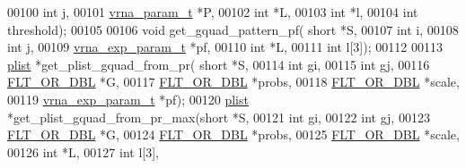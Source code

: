 \begin{DoxyCode}
00100                               \textcolor{keywordtype}{int} j,
00101                               \hyperlink{group__energy__parameters_structvrna__param__s}{vrna\_param\_t} *P,
00102                               \textcolor{keywordtype}{int} *L,
00103                               \textcolor{keywordtype}{int} *l,
00104                               \textcolor{keywordtype}{int} threshold);
00105 
00106 \textcolor{keywordtype}{void}        get\_gquad\_pattern\_pf( \textcolor{keywordtype}{short} *S,
00107                                   \textcolor{keywordtype}{int} i,
00108                                   \textcolor{keywordtype}{int} j,
00109                                   \hyperlink{group__energy__parameters_structvrna__exp__param__s}{vrna\_exp\_param\_t} *pf,
00110                                   \textcolor{keywordtype}{int} *L,
00111                                   \textcolor{keywordtype}{int} l[3]);
00112 
00113 \hyperlink{group__data__structures_structvrna__plist__s}{plist}       *get\_plist\_gquad\_from\_pr( \textcolor{keywordtype}{short} *S,
00114                                       \textcolor{keywordtype}{int} gi,
00115                                       \textcolor{keywordtype}{int} gj,
00116                                       \hyperlink{group__data__structures_ga31125aeace516926bf7f251f759b6126}{FLT\_OR\_DBL} *G,
00117                                       \hyperlink{group__data__structures_ga31125aeace516926bf7f251f759b6126}{FLT\_OR\_DBL} *probs,
00118                                       \hyperlink{group__data__structures_ga31125aeace516926bf7f251f759b6126}{FLT\_OR\_DBL} *scale,
00119                                       \hyperlink{group__energy__parameters_structvrna__exp__param__s}{vrna\_exp\_param\_t} *pf);
00120 \hyperlink{group__data__structures_structvrna__plist__s}{plist}       *get\_plist\_gquad\_from\_pr\_max(\textcolor{keywordtype}{short} *S,
00121                                       \textcolor{keywordtype}{int} gi,
00122                                       \textcolor{keywordtype}{int} gj,
00123                                       \hyperlink{group__data__structures_ga31125aeace516926bf7f251f759b6126}{FLT\_OR\_DBL} *G,
00124                                       \hyperlink{group__data__structures_ga31125aeace516926bf7f251f759b6126}{FLT\_OR\_DBL} *probs,
00125                                       \hyperlink{group__data__structures_ga31125aeace516926bf7f251f759b6126}{FLT\_OR\_DBL} *scale,
00126                                       \textcolor{keywordtype}{int} *L,
00127                                       \textcolor{keywordtype}{int} l[3],

\end{DoxyCode}
